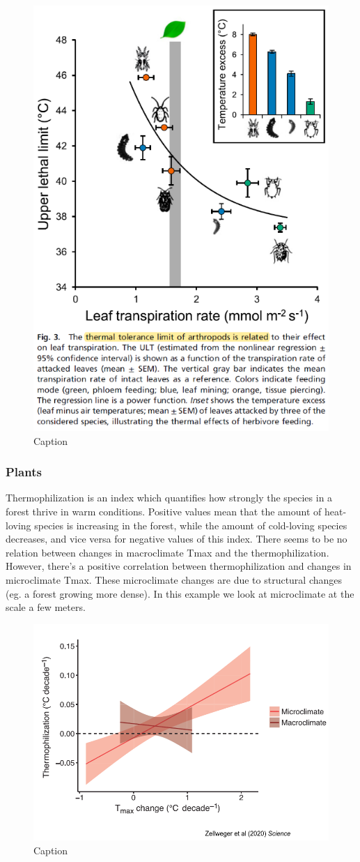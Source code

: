 \documentclass[12pt,oneside]{book}
\begin{document}
\begin{figure}

{\centering \includegraphics[width=0.5\linewidth]{figures/Figure1034} 

}

\caption{Caption}\label{fig:Micro34}
\end{figure}

\subsubsection{Plants}\label{plants}

Thermophilization is an index which quantifies how strongly the species
in a forest thrive in warm conditions. Positive values mean that the
amount of heat-loving species is increasing in the forest, while the
amount of cold-loving species decreases, and vice versa for negative
values of this index. There seems to be no relation between changes in
macroclimate Tmax and the thermophilization. However, there's a positive
correlation between thermophilization and changes in microclimate Tmax.
These microclimate changes are due to structural changes (eg. a forest
growing more dense). In this example we look at microclimate at the
scale a few meters.

\begin{figure}

{\centering \includegraphics[width=0.5\linewidth]{figures/Figure1035} 

}

\caption{Caption}\label{fig:Micro35}
\end{figure}
\end{document}
